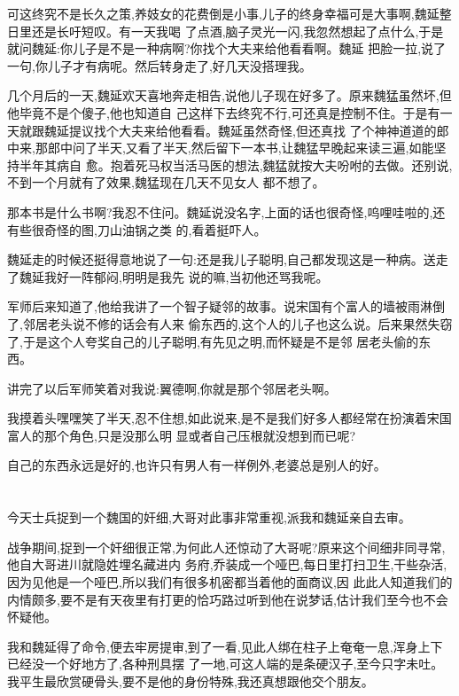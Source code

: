 ﻿\documentclass[12pt,twocolumn]{article}
\begin{document}
可这终究不是长久之策,养妓女的花费倒是小事,儿子的终身幸福可是大事啊,魏延整日里还是长吁短叹。有一天我喝
了点酒,脑子灵光一闪,我忽然想起了点什么,于是就问魏延:你儿子是不是一种病啊?你找个大夫来给他看看啊。魏延
把脸一拉,说了一句,你儿子才有病呢。然后转身走了,好几天没搭理我。

几个月后的一天,魏延欢天喜地奔走相告,说他儿子现在好多了。原来魏猛虽然坏,但他毕竟不是个傻子,他也知道自
己这样下去终究不行,可还真是控制不住。于是有一天就跟魏延提议找个大夫来给他看看。魏延虽然奇怪,但还真找
了个神神道道的郎中来,那郎中问了半天,又看了半天,然后留下一本书,让魏猛早晚起来读三遍,如能坚持半年其病自
愈。抱着死马权当活马医的想法,魏猛就按大夫吩咐的去做。还别说,不到一个月就有了效果,魏猛现在几天不见女人
都不想了。

那本书是什么书啊?我忍不住问。魏延说没名字,上面的话也很奇怪,呜哩哇啦的,还有些很奇怪的图,刀山油锅之类
的,看着挺吓人。

魏延走的时候还挺得意地说了一句:还是我儿子聪明,自己都发现这是一种病。送走了魏延我好一阵郁闷,明明是我先
说的嘛,当初他还骂我呢。

军师后来知道了,他给我讲了一个智子疑邻的故事。说宋国有个富人的墙被雨淋倒了,邻居老头说不修的话会有人来
偷东西的,这个人的儿子也这么说。后来果然失窃了,于是这个人夸奖自己的儿子聪明,有先见之明,而怀疑是不是邻
居老头偷的东西。

讲完了以后军师笑着对我说:翼德啊,你就是那个邻居老头啊。

我摸着头嘿嘿笑了半天,忍不住想,如此说来,是不是我们好多人都经常在扮演着宋国富人的那个角色,只是没那么明
显或者自己压根就没想到而已呢?

自己的东西永远是好的,也许只有男人有一样例外,老婆总是别人的好。

\section{}

今天士兵捉到一个魏国的奸细,大哥对此事非常重视,派我和魏延亲自去审。

战争期间,捉到一个奸细很正常,为何此人还惊动了大哥呢?原来这个间细非同寻常,他自大哥进川就隐姓埋名藏进内
务府,乔装成一个哑巴,每日里打扫卫生,干些杂活,因为见他是一个哑巴,所以我们有很多机密都当着他的面商议,因
此此人知道我们的内情颇多,要不是有天夜里有打更的恰巧路过听到他在说梦话,估计我们至今也不会怀疑他。

我和魏延得了命令,便去牢房提审,到了一看,见此人绑在柱子上奄奄一息,浑身上下已经没一个好地方了,各种刑具摆
了一地,可这人端的是条硬汉子,至今只字未吐。我平生最欣赏硬骨头,要不是他的身份特殊,我还真想跟他交个朋友。
\end{document}
